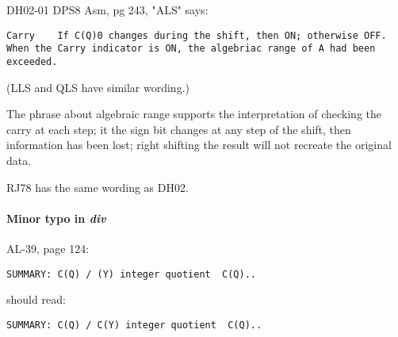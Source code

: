 \documentclass[notitlepage]{report}
\begin{document}
DH02-01 DPS8 Asm, pg 243, "ALS" says:

\begin{verbatim}
Carry    If C(Q)0 changes during the shift, then ON; otherwise OFF. When the Carry indicator is ON, the algebriac range of A had been exceeded.
\end{verbatim}

(LLS and QLS have similar wording.)

The phrase about algebraic range supports the interpretation of checking the carry at each step; it the sign bit changes at any step of the shift, then information has been lost; right shifting the result will not recreate the original data.

RJ78 has the same wording as DH02.

\paragraph{Minor typo in \emph{div}}

AL-39, page 124:

\begin{verbatim}
SUMMARY: C(Q) / (Y) integer quotient  C(Q)..
\end{verbatim}

should read:

\begin{verbatim}
SUMMARY: C(Q) / C(Y) integer quotient  C(Q)..
\end{verbatim}
\end{document}
